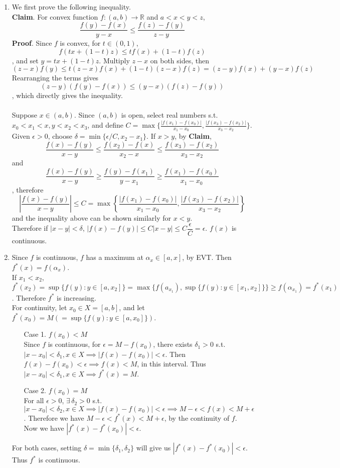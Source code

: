 \documentclass[11pt]{report}
\newcommand{\ra}{\rightarrow}
\newcommand{\abs}[1]{\left|#1\right|}
\newcommand{\imp}{\implies}
\newcommand{\R}{\mathbb{R}}
\begin{document}
\begin{enumerate}
\item We first prove the following inequality.\\
\textbf{Claim}. For convex function $f:(a, b)\ra \R$ and $a < x < y < z$, $$\frac{f(y) - f(x)}{y - x} \leq \frac{f(z) - f(y)}{z - y}$$
\textbf{Proof}. Since $f$ is convex, for $t\in (0, 1)$, $$f(tx +(1-t)z) \leq tf(x) + (1-t)f(z)$$, and set $y = tx + (1-t)z$. Multiply $z-x$ on both sides, then $$(z-x)f(y) \leq t(z-x)f(x) + (1-t)(z-x)f(z) = (z-y)f(x) + (y-x)f(z)$$
Rearranging the terms gives $$(z-y)(f(y)-f(x))\leq (y-x)(f(z)-f(y))$$
, which directly gives the inequality.\\
\\
Suppose $x\in (a, b)$. Since $(a, b)$ is open, select real numbers s.t. $x_0 < x_1 < x, y < x_2 < x_3$, and define $C = \max\{\frac{\abs{f(x_1) - f(x_0)}}{x_1-x_0}, \frac{\abs{f(x_3) - f(x_2)}}{x_3-x_2} \}$. Given $\epsilon > 0$, choose $\delta = \min\{\epsilon/C, x_2 - x_1\}$. 
If $x > y$, by \textbf{Claim}, $$\frac{f(x) - f(y)}{x-y} \leq \frac{f(x_2) - f(x)}{x_2-x} \leq \frac{f(x_3) - f(x_2)}{x_3-x_2}$$
and
$$\frac{f(x) - f(y)}{x -y} \geq \frac{f(y) - f(x_1)}{y - x_1} \geq \frac{f(x_1) - f(x_0)}{x_1-x_0} $$, therefore $$\abs{\frac{f(x)-f(y)}{x - y}} \leq C = \max\left\{\frac{\abs{f(x_1) - f(x_0)}}{x_1-x_0}, \frac{\abs{f(x_3) - f(x_2)}}{x_3-x_2} \right\}$$
and the inequality above can be shown similarly for $x < y$.\\
Therefore if $\abs{x - y} <\delta$, $\abs{f(x) - f(y)} \leq C\abs{x - y} \leq C \dfrac{\epsilon}{C} =\epsilon$. $f(x)$ is continuous.

\item Since $f$ is continuous, $f$ has a maximum at $\alpha_x \in [a, x]$, by EVT. Then $f^*(x) = f(\alpha_x)$.\\
If $x_1 < x_2$, $f^*(x_2) = \sup \{f(y):y\in[a, x_2] \} = \max\{f(a_{x_1}), \sup\{f(y):y\in[x_1, x_2]\} \} \geq f(\alpha_{x_1}) = f^*(x_1)$. Therefore $f^*$ is increasing.\\
For continuity, let $x_0\in X = [a, b]$, and let $f^*(x_0) = M (=\sup\{f(y): y\in[a, x_0] \})$.
\begin{enumerate}
	\item[Case 1.]  $f(x_0) < M$\\
	Since $f$ is continuous, for $\epsilon = M - f(x_0)$, there exists $\delta_1 > 0$ s.t. $\abs{x - x_0} < \delta_1, x\in X \imp \abs{f(x) - f(x_0)} < \epsilon$. Then $f(x) - f(x_0) < \epsilon \imp f(x) < M$, in this interval. Thus $\abs{x - x_0} < \delta_1, x\in X \imp f^*(x) = M$.
	\item[Case 2.] $f(x_0) = M$\\
	For all $\epsilon > 0$, $\exists\,\delta_2 > 0$ s.t. $\abs{x - x_0} < \delta_2, x\in X \imp \abs{f(x) - f(x_0)} < \epsilon \imp M - \epsilon < f(x) < M + \epsilon$. Therefore we have $M - \epsilon < f^*(x) < M + \epsilon$, by the continuity of $f$. Now we have $\abs{f^*(x) - f^*(x_0)} < \epsilon$. 
\end{enumerate}
For both cases, setting $\delta = \min\{\delta_1, \delta_2\}$ will give us $\abs{f^*(x) - f^*(x_0)} < \epsilon$. Thus $f^*$ is continuous.


\end{enumerate}
\end{document}
